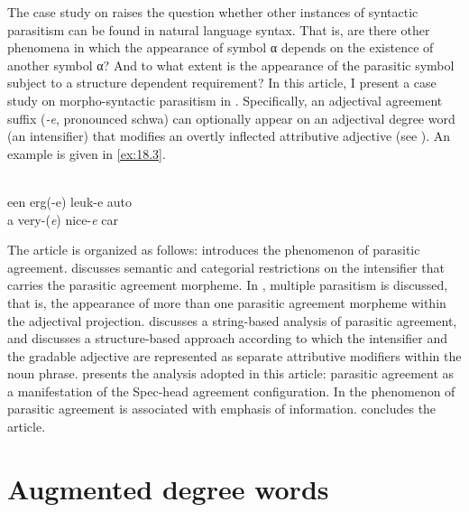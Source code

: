 \documentclass[output=paper]{langsci/langscibook}
\begin{document}
\label{ex:18.2}
\z

The case study on  raises the question whether other instances of
syntactic parasitism can be found in natural language syntax. That is, are
there other phenomena in which the appearance of symbol α depends on the
existence of another symbol α? And to what extent is the appearance of the
parasitic symbol subject to a structure dependent requirement? In this article,
I present a case study on morpho-syntactic parasitism in .
Specifically, an adjectival agreement suffix (\emph{-e}, pronounced schwa) can
optionally appear on an adjectival degree word (an intensifier) that modifies
an overtly inflected attributive adjective (see
\citealt{Verdenius1939,Royen1948,Corver1997a}). An example is given in
\eqref{ex:18.3}.

\ea%
    \label{ex:18.3}\\
    \gll een erg(-e) leuk-e auto\\
         a very-(\emph{e}) nice-\emph{e} car\\
    \glt
\z

The article is organized as follows:  introduces the phenomenon
of parasitic agreement.  discusses semantic and categorial
restrictions on the intensifier that carries the parasitic agreement morpheme.
In , multiple parasitism is discussed, that is, the appearance
of more than one parasitic agreement morpheme within the adjectival projection.
 discusses a string-based analysis of parasitic agreement, and
 discusses a structure-based approach according to which the
intensifier and the gradable adjective are represented as separate attributive
modifiers within the noun phrase.   presents the analysis
adopted in this article: parasitic agreement as a manifestation of the
Spec-head agreement configuration. In  the phenomenon of
parasitic agreement is associated with emphasis of information.
 concludes the article.

\section{Augmented degree words}\label{sec:18.2}
\end{document}
